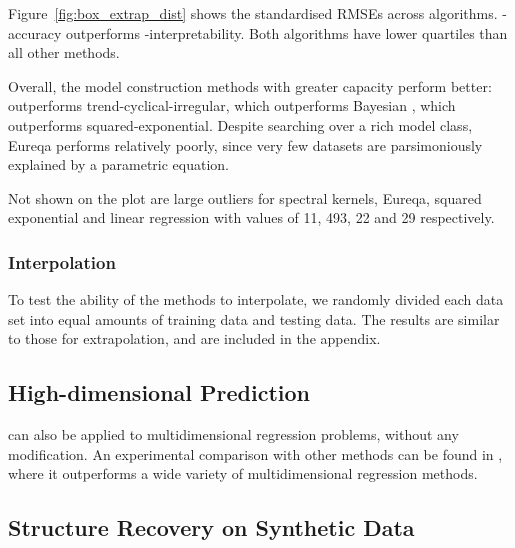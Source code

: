 Figure~\ref{fig:box_extrap_dist} shows the standardised RMSEs across algorithms.
\procedurename{}-accuracy outperforms \procedurename{}-interpretability.
Both algorithms have lower quartiles than all other methods.

Overall, the model construction methods with greater capacity perform better: \procedurename{} outperforms trend-cyclical-irregular, which outperforms Bayesian \MKL{}, which outperforms squared-exponential.
Despite searching over a rich model class, Eureqa performs relatively poorly, since very few datasets are parsimoniously explained by a parametric equation.

Not shown on the plot are large outliers for spectral kernels, Eureqa, squared exponential and linear regression with values of 11, 493, 22 and 29 respectively.

\subsubsection{Interpolation}
To test the ability of the methods to interpolate, we randomly divided each data set into equal amounts of training data and testing data.
The results are similar to those for extrapolation, and are included in the appendix.






\subsection{High-dimensional Prediction}

\procedurename{} can also be applied to multidimensional regression problems, without any modification.
An experimental comparison with other methods can be found in , where it outperforms a wide variety of multidimensional regression methods.



\subsection{Structure Recovery on Synthetic Data}
\label{sec:synthetic}

